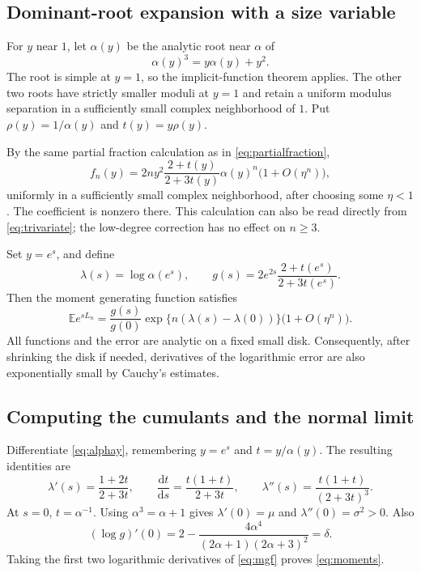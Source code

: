 \documentclass[11pt,letterpaper]{article}
\numberwithin{equation}{section}
\theoremstyle{definition}
\newcommand{\E}{\mathbb E}
\newcommand{\1}{\mathbf 1}
\begin{document}
\subsection{Dominant-root expansion with a size variable}
For $y$ near $1$, let $\alpha(y)$ be the analytic root near $\alpha$ of
\begin{equation}\label{eq:alphay}
 \alpha(y)^3=y\alpha(y)+y^2.
\end{equation}
The root is simple at $y=1$, so the implicit-function theorem applies.
The other two roots have strictly smaller moduli at $y=1$ and retain a uniform
modulus separation in a sufficiently small complex neighborhood of $1$.
Put $\rho(y)=1/\alpha(y)$ and $t(y)=y\rho(y)$.

By the same partial fraction calculation as in \eqref{eq:partialfraction},
\begin{equation}\label{eq:weightedasy}
 f_n(y)=2ny^2\frac{2+t(y)}{2+3t(y)}\alpha(y)^n
             \bigl(1+O(\eta^n)\bigr),
\end{equation}
uniformly in a sufficiently small complex neighborhood, after choosing some
$\eta<1$. The coefficient is nonzero there. This calculation can also be read
directly from \eqref{eq:trivariate}; the low-degree correction has no effect
on $n\ge3$.

Set $y=e^s$, and define
\begin{equation}\label{eq:lambdag}
 \lambda(s)=\log\alpha(e^s),\qquad
 g(s)=2e^{2s}\frac{2+t(e^s)}{2+3t(e^s)}.
\end{equation}
Then the moment generating function satisfies
\begin{equation}\label{eq:mgf}
 \E e^{sL_n}
 =\frac{g(s)}{g(0)}\exp\{n(\lambda(s)-\lambda(0))\}
     \bigl(1+O(\eta^n)\bigr).
\end{equation}
All functions and the error are analytic on a fixed small disk. Consequently,
after shrinking the disk if needed, derivatives of the logarithmic error
are also exponentially small by Cauchy's estimates.

\subsection{Computing the cumulants and the normal limit}
Differentiate \eqref{eq:alphay}, remembering $y=e^s$ and $t=y/\alpha(y)$.
The resulting identities are
\begin{equation}\label{eq:dt}
 \lambda'(s)=\frac{1+2t}{2+3t},\qquad
 \frac{\mathrm dt}{\mathrm ds}=\frac{t(1+t)}{2+3t},\qquad
 \lambda''(s)=\frac{t(1+t)}{(2+3t)^3}.
\end{equation}
At $s=0$, $t=\alpha^{-1}$. Using $\alpha^3=\alpha+1$ gives
$\lambda'(0)=\mu$ and $\lambda''(0)=\sigma^2>0$.
Also
\[
 (\log g)'(0)
 =2-\frac{4\alpha^4}{(2\alpha+1)(2\alpha+3)^2}=\delta.
\]
Taking the first two logarithmic derivatives of \eqref{eq:mgf} proves
\eqref{eq:moments}.
\end{document}
